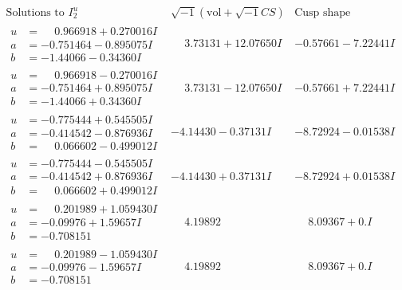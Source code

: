 \documentclass[1p]{elsarticle_modified}
\theoremstyle{definition}
\newcommand{\I}{\sqrt{-1}}
\begin{document}
$$\begin{array}{c|c|c}  
\text{Solutions to }I^u_{2}& \I (\text{vol} + \sqrt{-1}CS) & \text{Cusp shape}\\
 \hline 
\begin{aligned}
u &= \phantom{-}0.966918 + 0.270016 I \\
a &= -0.751464 - 0.895075 I \\
b &= -1.44066 - 0.34360 I\end{aligned}
 & \phantom{-}3.73131 + 12.07650 I & -0.57661 - 7.22441 I \\ \hline\begin{aligned}
u &= \phantom{-}0.966918 - 0.270016 I \\
a &= -0.751464 + 0.895075 I \\
b &= -1.44066 + 0.34360 I\end{aligned}
 & \phantom{-}3.73131 - 12.07650 I & -0.57661 + 7.22441 I \\ \hline\begin{aligned}
u &= -0.775444 + 0.545505 I \\
a &= -0.414542 - 0.876936 I \\
b &= \phantom{-}0.066602 - 0.499012 I\end{aligned}
 & -4.14430 - 0.37131 I & -8.72924 - 0.01538 I \\ \hline\begin{aligned}
u &= -0.775444 - 0.545505 I \\
a &= -0.414542 + 0.876936 I \\
b &= \phantom{-}0.066602 + 0.499012 I\end{aligned}
 & -4.14430 + 0.37131 I & -8.72924 + 0.01538 I \\ \hline\begin{aligned}
u &= \phantom{-}0.201989 + 1.059430 I \\
a &= -0.09976 + 1.59657 I \\
b &= -0.708151\phantom{ +0.000000I}\end{aligned}
 & \phantom{-}4.19892\phantom{ +0.000000I} & \phantom{-}8.09367 + 0. I\phantom{ +0.000000I} \\ \hline\begin{aligned}
u &= \phantom{-}0.201989 - 1.059430 I \\
a &= -0.09976 - 1.59657 I \\
b &= -0.708151\phantom{ +0.000000I}\end{aligned}
 & \phantom{-}4.19892\phantom{ +0.000000I} & \phantom{-}8.09367 + 0. I\phantom{ +0.000000I} \\ \hline\begin{aligned}

\end{aligned}
\end{array}$$
\end{document}
